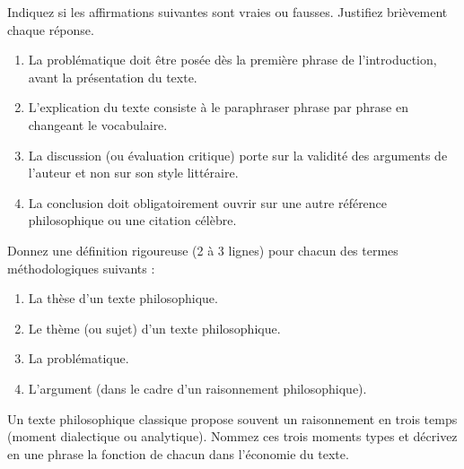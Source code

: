 \documentclass[11pt]{article}
\newcounter{popsec}
\newcounter{popsub}
\newcommand{\courssub}[1]{%
  \stepcounter{popsub}%
  \par\vspace{9pt}\noindent{\popxbold\fontsize{11.5}{13}\selectfont\color{popink}{\color{poporange}\thepopsec.\thepopsub}\hspace{6pt}#1}\par\nopagebreak\vspace{4pt}
}
\begin{document}
\begin{exercice}
Indiquez si les affirmations suivantes sont vraies ou fausses. Justifiez brièvement chaque réponse.
\begin{enumerate}
\item La problématique doit être posée dès la première phrase de l'introduction, avant la présentation du texte.
\item L'explication du texte consiste à le paraphraser phrase par phrase en changeant le vocabulaire.
\item La discussion (ou évaluation critique) porte sur la validité des arguments de l'auteur et non sur son style littéraire.
\item La conclusion doit obligatoirement ouvrir sur une autre référence philosophique ou une citation célèbre.
\end{enumerate}
\end{exercice}

\begin{exercice}
Donnez une définition rigoureuse (2 à 3 lignes) pour chacun des termes méthodologiques suivants :
\begin{enumerate}
\item La thèse d'un texte philosophique.
\item Le thème (ou sujet) d'un texte philosophique.
\item La problématique.
\item L'argument (dans le cadre d'un raisonnement philosophique).
\end{enumerate}
\end{exercice}

\begin{exercice}
Un texte philosophique classique propose souvent un raisonnement en trois temps (moment dialectique ou analytique). Nommez ces trois moments types et décrivez en une phrase la fonction de chacun dans l'économie du texte.
\end{exercice}

\courssub{Je m'entraîne}
\end{document}
